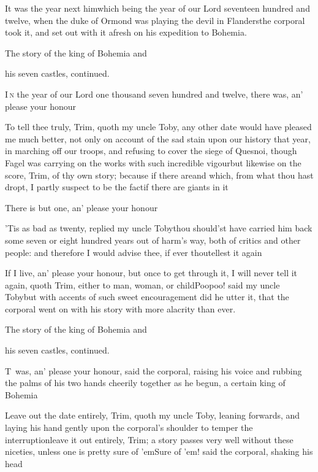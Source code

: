 \documentclass{article}
\begin{document}
\tsk It was the year next him\tsk\break which being
the year of our Lord\break 
seventeen hundred and twelve, when\break
the duke of Ormond was playing the devil in
Flanders\tsh the corporal took it, and set out with
it afresh on his expedition to Bohemia.

\vfill {} \eject\null\smallskip
\centerline{The story of the king of Bohemia and}
\centerline{his seven castles, continued.}

\lettrine{I}{\,n} the year of our Lord one thousand seven hundred and twelve, there
was, an’ please your honour\tsh

\tsh To tell thee truly, Trim, quoth my uncle
Toby, any other date would have pleased me much better, not
only on account of the sad stain upon our history that year, in
marching off our troops, and refusing to cover the siege of
Quesnoi, though Fagel was carrying on the works with
such incredible vigour\tsk but likewise on the score,
Trim, of thy own story; because if there are\tsk and
which, from what thou hast dropt, I partly suspect to be the
fact\tsk if there are giants in it\tsh

There is but one, an’ please your honour\tsh

\tsh ’Tis as bad as twenty, replied my uncle
Toby\tsh thou should’st have carried him back
some seven or eight hundred years out of harm’s way, both of
critics and other people: and therefore I would advise thee, if
ever thou\break tellest it again\tsh

\tsh If I live, an’ please your honour, but once
to get through it, I will never tell it again, quoth Trim,
either to man, woman, or child\tsh Poo\tsk poo! said my uncle Toby\tsk but with accents of
such sweet encouragement did he utter it, that the corporal went on
with his story with more alacrity than ever.

\bigskip
\centerline{The story of the king of Bohemia and}
\centerline{his seven castles, continued.}

\lettrine{T}{\,} was, an’ please your
honour, said the corporal, raising his voice and rubbing the palms
of his two hands cheerily together as he begun, a certain king of
Bohemia\tsh

\tsh Leave out the date entirely, Trim, quoth my
uncle Toby, leaning forwards, and laying his hand gently
upon the corporal’s shoulder to temper the
interruption\tsk leave it out entirely, Trim; a story
passes very well without these niceties, unless one is pretty sure
of ’em\tsh Sure of ’em! said the corporal,
shaking his head\tsh
\end{document}
